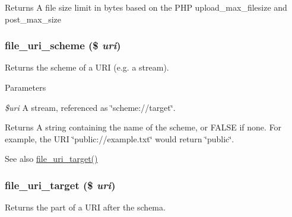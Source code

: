 \begin{DoxyReturn}{Returns}
A file size limit in bytes based on the PHP upload\_\-max\_\-filesize and post\_\-max\_\-size 
\end{DoxyReturn}
\hypertarget{group__file_gaa98f967fe1033030e7e5262adda85463}{
\subsubsection[{file\_\-uri\_\-scheme}]{\setlength{\rightskip}{0pt plus 5cm}file\_\-uri\_\-scheme (\$ {\em uri})}}
\label{group__file_gaa98f967fe1033030e7e5262adda85463}
Returns the scheme of a URI (e.g. a stream).


\begin{DoxyParams}{Parameters}
\item[{\em \$uri}]A stream, referenced as \char`\"{}scheme://target\char`\"{}.\end{DoxyParams}
\begin{DoxyReturn}{Returns}
A string containing the name of the scheme, or FALSE if none. For example, the URI \char`\"{}public://example.txt\char`\"{} would return \char`\"{}public\char`\"{}.
\end{DoxyReturn}
\begin{DoxySeeAlso}{See also}
\hyperlink{group__file_ga3137c530a505bcbaaeff3c4265f3f662}{file\_\-uri\_\-target()} 
\end{DoxySeeAlso}
\hypertarget{group__file_ga3137c530a505bcbaaeff3c4265f3f662}{
\subsubsection[{file\_\-uri\_\-target}]{\setlength{\rightskip}{0pt plus 5cm}file\_\-uri\_\-target (\$ {\em uri})}}
\label{group__file_ga3137c530a505bcbaaeff3c4265f3f662}
Returns the part of a URI after the schema.


